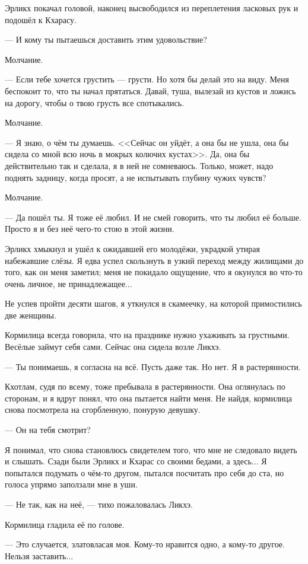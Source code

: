 Эрликх покачал головой, наконец высвободился из переплетения ласковых рук и подошёл к Кхарасу.

--- И кому ты пытаешься доставить этим удовольствие?

Молчание.

--- Если тебе хочется грустить --- грусти.
Но хотя бы делай это на виду.
Меня беспокоит то, что ты начал прятаться.
Давай, туша, вылезай из кустов и ложись на дорогу, чтобы о твою грусть все спотыкались.

Молчание.

--- Я знаю, о чём ты думаешь.
<<Сейчас он уйдёт, а она бы не ушла, она бы сидела со мной всю ночь в мокрых колючих кустах>>.
Да, она бы действительно так и сделала, я в ней не сомневаюсь.
Только, может, надо поднять задницу, когда просят, а не испытывать глубину чужих чувств?

Молчание.

--- Да пошёл ты.
Я тоже её любил.
И не смей говорить, что ты любил её больше.
Просто я и без неё чего-то стою в этой жизни.

Эрликх хмыкнул и ушёл к ожидавшей его молодёжи, украдкой утирая набежавшие слёзы.
Я едва успел скользнуть в узкий переход между жилищами до того, как он меня заметил;
меня не покидало ощущение, что я окунулся во что-то очень личное, не принадлежащее...

Не успев пройти десяти шагов, я уткнулся в скамеечку, на которой примостились две женщины.

Кормилица всегда говорила, что на празднике нужно ухаживать за грустными.
Весёлые займут себя сами.
Сейчас она сидела возле Ликхэ.

--- Ты понимаешь, я согласна на всё.
Пусть даже так.
Но нет. Я в растерянности.

Кхотлам, судя по всему, тоже пребывала в растерянности.
Она оглянулась по сторонам, и я вдруг понял, что она пытается найти меня.
Не найдя, кормилица снова посмотрела на сгорбленную, понурую девушку.

--- Он на тебя смотрит?

Я понимал, что снова становлюсь свидетелем того, что мне не следовало видеть и слышать.
Сзади были Эрликх и Кхарас со своими бедами, а здесь...
Я попытался подумать о чём-то другом, пытался посчитать про себя до ста, но голоса упрямо заползали мне в уши.

--- Не так, как на неё, --- тихо пожаловалась Ликхэ.

Кормилица гладила её по голове.

--- Это случается, златовласая моя.
Кому-то нравится одно, а кому-то другое.
Нельзя заставить...

